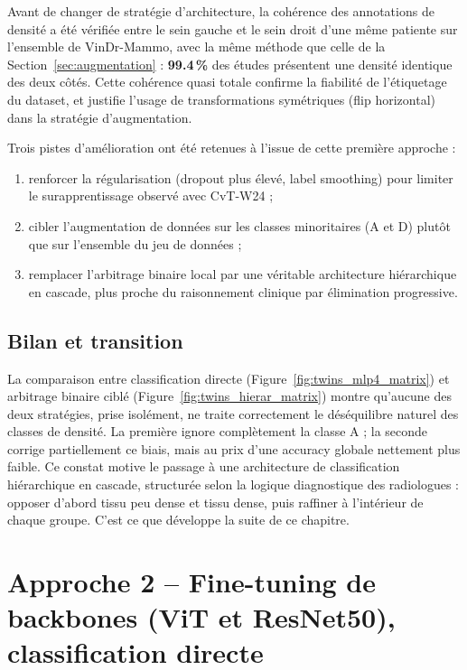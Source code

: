\documentclass[12pt,a4paper]{report}
\begin{document}
Avant de changer de stratégie d'architecture, la cohérence des annotations
de densité a été vérifiée entre le sein gauche et le sein droit d'une même
patiente sur l'ensemble de VinDr-Mammo, avec la même méthode que celle de
la Section~\ref{sec:augmentation} : \textbf{99.4\,\%} des études présentent
une densité identique des deux côtés. Cette cohérence quasi totale confirme
la fiabilité de l'étiquetage du dataset, et justifie l'usage de
transformations symétriques (flip horizontal) dans la stratégie
d'augmentation.

Trois pistes d'amélioration ont été retenues à l'issue de cette première
approche :
\begin{enumerate}
    \item renforcer la régularisation (dropout plus élevé, label smoothing) pour limiter le surapprentissage observé avec CvT-W24 ;
    \item cibler l'augmentation de données sur les classes minoritaires (A et D) plutôt que sur l'ensemble du jeu de données ;
    \item remplacer l'arbitrage binaire local par une véritable architecture hiérarchique en cascade, plus proche du raisonnement clinique par élimination progressive.
\end{enumerate}

\subsection{Bilan et transition}
La comparaison entre classification directe
(Figure~\ref{fig:twins_mlp4_matrix}) et arbitrage binaire ciblé
(Figure~\ref{fig:twins_hierar_matrix}) montre qu'aucune des deux stratégies,
prise isolément, ne traite correctement le déséquilibre naturel des classes
de densité. La première ignore complètement la classe A ; la seconde
corrige partiellement ce biais, mais au prix d'une accuracy globale
nettement plus faible. Ce constat motive le passage à une architecture de
classification hiérarchique en cascade, structurée selon la logique
diagnostique des radiologues : opposer d'abord tissu peu dense et tissu
dense, puis raffiner à l'intérieur de chaque groupe. C'est ce que développe
la suite de ce chapitre.

\section{Approche 2 -- Fine-tuning de backbones (ViT et ResNet50), classification directe}
\label{sec:approche2}
\end{document}
